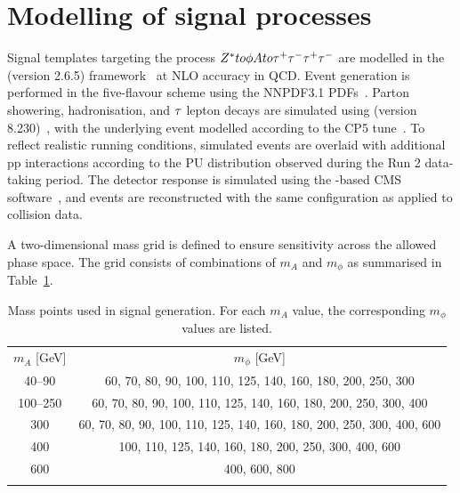 \section{Modelling of signal processes}
\label{Section:Chapter6_SignalModelling}

Signal templates targeting the process $Z^* to \phi A to \tau^+\tau^-\tau^+\tau^-$ are modelled in the \MCATNLO (version 2.6.5) framework~\cite{MadGraph,FxFx} at \ac{NLO} accuracy in \ac{QCD}. Event generation is performed in the five-flavour scheme using the NNPDF3.1 PDFs~\cite{NNPDF}. Parton showering, hadronisation, and $\tau$ lepton decays are simulated using \PYTHIA (version 8.230)~\cite{PYTHIA}, with the underlying event modelled according to the CP5 tune~\cite{CP5_Tune}. To reflect realistic running conditions, simulated events are overlaid with additional pp interactions according to the \ac{PU} distribution observed during the Run 2 data-taking period. The detector response is simulated using the \GEANTfour-based \ac{CMS} software~\cite{GEANT4}, and events are reconstructed with the same configuration as applied to collision data.

A two-dimensional mass grid is defined to ensure sensitivity across the allowed phase space. The grid consists of combinations of $m_A$ and $m_\phi$ as summarised in Table~\ref{Table:Chapter6_4tauMassGrid}.

\begin{table}[!htbp]
\centering
\renewcommand{\arraystretch}{1.5} %
\setlength{\tabcolsep}{12pt} %
\begin{tabular}{cc}
\hline
$m_A$ [GeV] & $m_\phi$ [GeV] \\
\arrayrulecolor{black} \hline

40--90     & 60, 70, 80, 90, 100, 110, 125, 140, 160, 180, 200, 250, 300 \\
\arrayrulecolor{lightgray} \hline

100--250   & 60, 70, 80, 90, 100, 110, 125, 140, 160, 180, 200, 250, 300, 400 \\
\arrayrulecolor{lightgray} \hline

300        & 60, 70, 80, 90, 100, 110, 125, 140, 160, 180, 200, 250, 300, 400, 600 \\
\arrayrulecolor{lightgray} \hline

400        & 100, 110, 125, 140, 160, 180, 200, 250, 300, 400, 600 \\
\arrayrulecolor{lightgray} \hline

600        & 400, 600, 800 \\
\arrayrulecolor{black} \hline

\end{tabular}
\caption{Mass points used in signal generation. For each $m_A$ value, the corresponding $m_\phi$ values are listed.}
\label{Table:Chapter6_4tauMassGrid}
\end{table}

